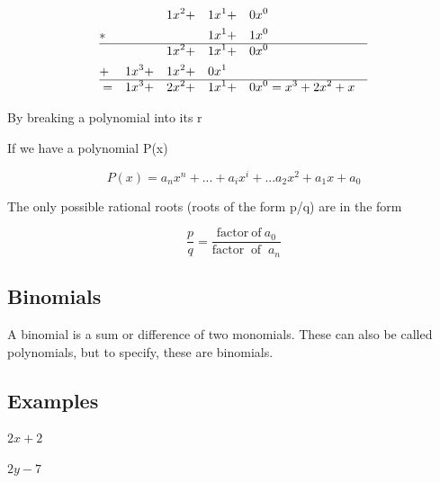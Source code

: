 \begin{align} & &  & &1x^2&+&1x^1&+&0x^0 \\ &*&  & & & &1x^1&+&1x^0 \\ \hline & &  & &1x^2&+&1x^1&+&0x^0 \\ &+&1x^3 &+&1x^2&+&0x^1& & \\ \hline &=&1x^3 &+&2x^2&+&1x^1&+&0x^0 & = x^3 + 2x^2 + x \end{align}



By breaking a polynomial into its r



If we have a polynomial P(x)



$$P(x) = a _n x^n + ... + a _i x^i + ... a _2 x^2 + a _1 x + a _0 $$



The only possible rational roots (roots of the form p/q) are in the form



$$\frac{p}{q}=\frac{\text{factor}\ \text{of}\ a _0}{\text{factor}\ \text{ of }\ a _n}$$




\subsection{Binomials}
\label{sss:bino-3aef}




A binomial is a sum or difference of two monomials. These can also be called polynomials,
but to specify, these are binomials.




\subsection{Examples}
\label{sss:exam-bfeb}




$2x + 2$



$2y - 7$




